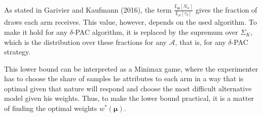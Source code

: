 \documentclass[12pt,]{article}
\begin{document}
As stated in Garivier and Kaufmann (2016), the term
\(\frac{\mathbb{E}_{\bm{\mu}}[N_a]}{\mathbb{E}_{\mu}[\tau_{\delta}]}\)
gives the fraction of draws each arm receives. This value, however,
depends on the used algorithm. To make it hold for any \(\delta\)-PAC
algorithm, it is replaced by the supremum over \(\Sigma_K\), which is
the distribution over these fractions for any \(\mathcal{A}\), that is,
for any \(\delta\)-PAC strategy.

This lower bound can be interpreted as a Minimax game, where the
experimenter has to choose the share of samples he attributes to each
arm in a way that is optimal given that nature will respond and choose
the most difficult alternative model given his weights. Thus, to make
the lower bound practical, it is a matter of finding the optimal weights
\(w^*(\bm{\mu})\).
\end{document}
